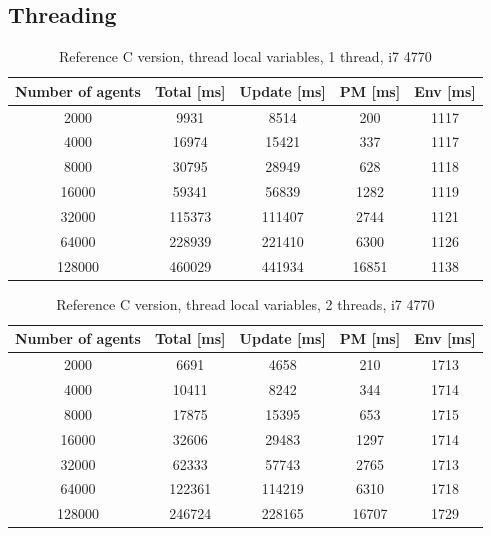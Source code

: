 \documentclass[12pt, a4paper]{report}
\begin{document}
\begin{appendices}
\subsection{Threading}\label{appen-subsec:bench-ref-c-multi}
\begin{table}[H]
  \begin{center}
    \begin{tabular}{|c||c||c|c|c|}
    \hline
    Number of agents & Total [ms] & Update [ms] & PM [ms] & Env [ms] \\ \hline
    2000             & 9931       & 8514        & 200     & 1117     \\
    4000             & 16974      & 15421       & 337     & 1117     \\
    8000             & 30795      & 28949       & 628     & 1118     \\
    16000            & 59341      & 56839       & 1282    & 1119     \\
    32000            & 115373     & 111407      & 2744    & 1121     \\
    64000            & 228939     & 221410      & 6300    & 1126     \\
    128000           & 460029     & 441934      & 16851   & 1138     \\ \hline
    \end{tabular}
    \caption {Reference C version, thread local variables, 1 thread, i7 4770}
    \label{table:append-reference-timings-1-thread-line}
  \end{center}
\end{table}

\begin{table}[H]
  \begin{center}
    \begin{tabular}{|c||c||c|c|c|}
    \hline
    Number of agents & Total [ms] & Update [ms] & PM [ms] & Env [ms] \\ \hline
    2000             & 6691       & 4658        & 210     & 1713     \\
    4000             & 10411      & 8242        & 344     & 1714     \\
    8000             & 17875      & 15395       & 653     & 1715     \\
    16000            & 32606      & 29483       & 1297    & 1714     \\
    32000            & 62333      & 57743       & 2765    & 1713     \\
    64000            & 122361     & 114219      & 6310    & 1718     \\
    128000           & 246724     & 228165      & 16707   & 1729     \\ \hline
    \end{tabular}
    \caption {Reference C version, thread local variables, 2 threads, i7 4770}
    \label{table:append-reference-timings-2-thread-line}
  \end{center}
\end{table}


\end{appendices}
\end{document}

